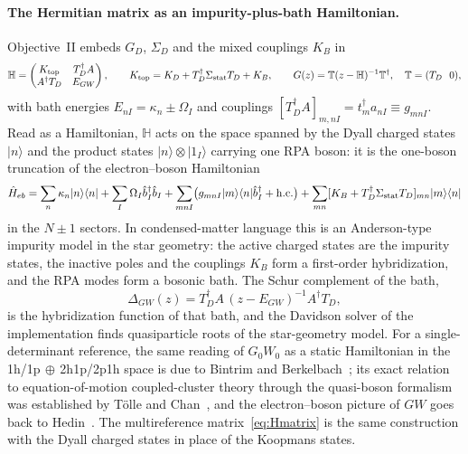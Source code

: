 \documentclass[11pt,a4paper]{article}
\newcommand{\bbH}{\mathbb{H}}
\newcommand{\bbT}{\mathbb{T}}
\newcommand{\ket}[1]{|#1\rangle}
\newcommand{\bra}[1]{\langle#1|}
\newcommand{\GW}{$GW$}
\begin{document}
\paragraph{The Hermitian matrix as an impurity-plus-bath Hamiltonian.}
Objective~II embeds $G_D$, $\Sigma_D$ and the mixed couplings $K_B$ in
\begin{equation}
  \bbH=\begin{pmatrix}K_{\rm top}&T_D^\dagger A\\ A^\dagger T_D&E_{GW}\end{pmatrix},
  \qquad
  K_{\rm top}=K_D+T_D^\dagger\Sigma_{\rm stat}T_D+K_B,
  \qquad
  G(z)=\bbT(z-\bbH)^{-1}\bbT^\dagger,\quad \bbT=(T_D\ \ 0),
  \label{eq:Hmatrix}
\end{equation}
with bath energies $E_{nI}=\kappa_n\pm\Omega_I$ and couplings
$[T_D^\dagger A]_{m,nI}=t_m^\dagger a_{nI}\equiv g_{mnI}$.  Read as a
Hamiltonian, $\bbH$ acts on the space spanned by the Dyall charged states
$\ket{n}$ and the product states $\ket{n}\otimes\ket{1_I}$ carrying one
RPA boson: it is the one-boson truncation of the electron--boson Hamiltonian
\begin{equation}
  \hat H_{eb}=\sum_n\kappa_n\ket{n}\bra{n}+\sum_I\Omega_I\hat b_I^\dagger\hat b_I
  +\sum_{mnI}\bigl(g_{mnI}\ket{m}\bra{n}\hat b_I^\dagger+\mathrm{h.c.}\bigr)
  +\sum_{mn}[K_B+T_D^\dagger\Sigma_{\rm stat}T_D]_{mn}\ket{m}\bra{n}
  \label{eq:Heb}
\end{equation}
in the $N\pm1$ sectors.  In condensed-matter language this is an Anderson-type
impurity model in the star geometry: the active charged states are the
impurity states, the inactive poles and the couplings $K_B$ form a
first-order hybridization, and the RPA modes form a bosonic bath.  The Schur
complement of the bath,
\begin{equation}
  \Delta_{GW}(z)=T_D^\dagger A\,(z-E_{GW})^{-1}A^\dagger T_D ,
  \label{eq:hybridization}
\end{equation}
is the hybridization function of that bath, and the Davidson solver of the
implementation finds quasiparticle roots of the star-geometry model.  For a
single-determinant reference, the same reading of $G_0W_0$ as a static
Hamiltonian in the 1h/1p$\,\oplus\,$2h1p/2p1h space is due to Bintrim and
Berkelbach~\cite{BintrimBerkelbach2021}; its exact relation to
equation-of-motion coupled-cluster theory through the quasi-boson formalism
was established by T\"olle and Chan~\cite{TolleChan2023}, and the
electron--boson picture of \GW{} goes back to Hedin~\cite{Hedin1999}.  The
multireference matrix~\eqref{eq:Hmatrix} is the same construction with the
Dyall charged states in place of the Koopmans states.
\end{document}
